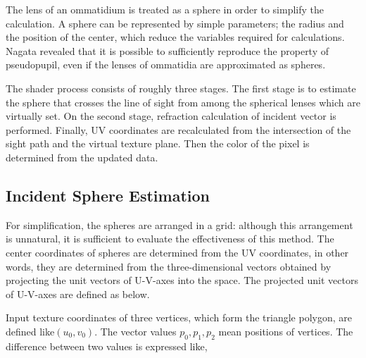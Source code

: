 The lens of an ommatidium is treated as a sphere in order to simplify the calculation.
A sphere can be represented by simple parameters; the radius and the position of the center, which reduce the variables required for calculations.
Nagata\cite{} revealed that it is possible to sufficiently reproduce the property of pseudopupil, even if the lenses of ommatidia are approximated as spheres.

The shader process consists of roughly three stages.
The first stage is to estimate the sphere that crosses the line of sight from among the spherical lenses which are virtually set.
On the second stage, refraction calculation of incident vector is performed. Finally, UV coordinates are recalculated from the intersection of the sight path and the virtual texture plane. Then the color of the pixel is determined from the updated data.

\subsection{Incident Sphere Estimation}

For simplification, the spheres are arranged in a grid: although this arrangement is unnatural, it is sufficient to evaluate the effectiveness of this method.
The center coordinates of spheres are determined from the UV coordinates, in other words, they are determined from the three-dimensional vectors obtained by projecting the unit vectors of U-V-axes into the space.
The projected unit vectors of U-V-axes are defined as below.




Input texture coordinates of three vertices, which form the triangle polygon, are defined like$(u_0,v_0)$.
The vector values $p_0, p_1, p_2$ mean positions of vertices.
The difference between two values is expressed like,

